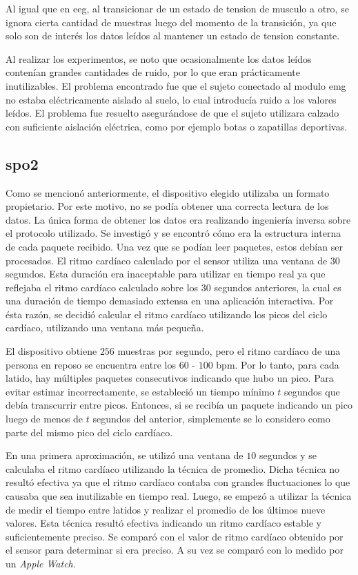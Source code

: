 Al igual que en \acrshort{eeg}, al transicionar de un estado de tension de musculo a otro, se ignora cierta cantidad de muestras luego del momento de la transición, ya que solo son de interés los datos leídos al mantener un estado de tension constante. 

Al realizar los experimentos, se noto que ocasionalmente los datos leídos contenían grandes cantidades de ruido, por lo que eran prácticamente inutilizables. El problema encontrado fue que el sujeto conectado al modulo \acrshort{emg} no estaba eléctricamente aislado al suelo, lo cual introducía ruido a los valores leídos. El problema fue resuelto asegurándose de que el sujeto utilizara calzado con suficiente aislación eléctrica, como por ejemplo botas o zapatillas deportivas.

\subsection{\acrshort{spo2}} \label{sec:spo2-signal-processing}

Como se mencionó anteriormente, el dispositivo elegido utilizaba un formato propietario. Por este motivo, no se podía obtener una correcta lectura de los datos. La única forma de obtener los datos era realizando ingeniería inversa sobre el protocolo utilizado. Se investigó y se encontró cómo era la estructura interna de cada paquete recibido. Una vez que se podían leer paquetes, estos debían ser procesados. El ritmo cardíaco calculado por el sensor utiliza una ventana de 30 segundos. Esta duración era inaceptable para utilizar en tiempo real ya que reflejaba el ritmo cardíaco calculado sobre los 30 segundos anteriores, la cual es una duración de tiempo demasiado extensa en una aplicación interactiva. Por ésta razón, se decidió calcular el ritmo cardíaco utilizando los picos del ciclo cardíaco, utilizando una ventana más pequeña.

El dispositivo obtiene $256$ muestras por segundo, pero el ritmo cardíaco de una persona en reposo se encuentra entre los $60$ - $100$ \acrshort{bpm}. Por lo tanto, para cada latido, hay múltiples paquetes consecutivos indicando que hubo un pico. Para evitar estimar incorrectamente, se estableció un tiempo mínimo $t$ segundos que debía transcurrir entre picos. Entonces, si se recibía un paquete indicando un pico luego de menos de $t$ segundos del anterior, simplemente se lo considero como parte del mismo pico del ciclo cardíaco.

En una primera aproximación, se utilizó una ventana de $10$ segundos y se calculaba el ritmo cardíaco utilizando la técnica de promedio. Dicha técnica no resultó efectiva ya que el ritmo cardíaco contaba con grandes fluctuaciones lo que causaba que sea inutilizable en tiempo real. Luego, se empezó a utilizar la técnica de medir el tiempo entre latidos y realizar el promedio de los últimos nueve valores. Esta técnica resultó efectiva indicando un ritmo cardíaco estable y suficientemente preciso. Se comparó con el valor de ritmo cardíaco obtenido por el sensor para determinar si era preciso. A su vez se comparó con lo medido por un \emph{Apple Watch}.

